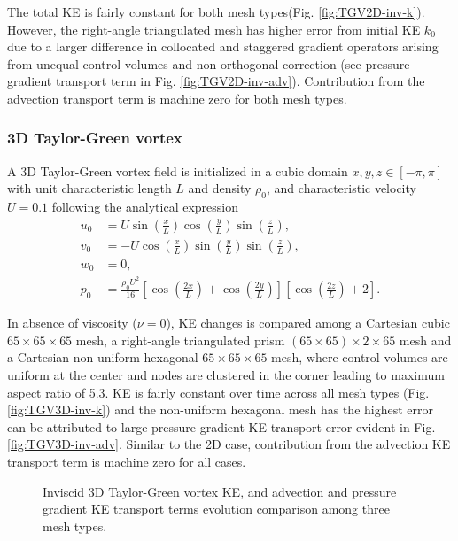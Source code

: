 The total KE is fairly constant for both mesh types(Fig. \ref{fig:TGV2D-inv-k}). However, the right-angle triangulated mesh has higher error from initial KE $k_0$ due to a larger difference in collocated and staggered gradient operators arising from unequal control volumes and non-orthogonal correction (see pressure gradient transport term in Fig. \ref{fig:TGV2D-inv-adv}). Contribution from the advection transport term is machine zero for both mesh types.


\subsubsection{3D Taylor-Green vortex}
A 3D Taylor-Green vortex field is initialized in a cubic domain $x, y,z \in [-\pi, \pi]$ with unit characteristic length $L$ and density $\rho_0$, and characteristic velocity $U=0.1$ following the analytical expression
\begin{equation}
\begin{split}
u_0 &=U \sin \left(\frac{x}{L}\right) \cos \left(\frac{y}{L}\right) \sin \left(\frac{z}{L}\right),
\\
v_0 &=-U \cos \left(\frac{x}{L}\right) \sin \left(\frac{y}{L}\right) \sin \left(\frac{z}{L}\right), 
\\
w_0 &=0, 
\\
p_0 &=\frac{\rho_{0} U^{2}}{16} \left[\cos \left(\frac{2 x}{L}\right)+\cos \left(\frac{2 y}{L}\right)\right] \left[\cos \left(\frac{2 z}{L}\right)+2\right].
\end{split}
\end{equation}

In absence of viscosity ($\nu=0$), KE changes is compared among a Cartesian cubic $65 \times 65 \times 65$ mesh, a right-angle triangulated prism $(65 \times 65)\times 2 \times 65$ mesh and a Cartesian non-uniform hexagonal $65 \times 65 \times 65$ mesh, where control volumes are uniform at the center and nodes are clustered in the corner leading to maximum aspect ratio of 5.3. KE is fairly constant over time across all mesh types (Fig. \ref{fig:TGV3D-inv-k}) and the non-uniform hexagonal mesh has the highest error can be attributed to large pressure gradient KE transport error evident in Fig. \ref{fig:TGV3D-inv-adv}. Similar to the 2D case, contribution from the advection KE transport term is machine zero for all cases.

\begin{figure}[!h]
\centering
{}
\caption{Inviscid 3D Taylor-Green vortex KE, and advection and pressure gradient KE transport terms evolution comparison among three mesh types.} 
\label{fig:TGV3D-inv}
\end{figure}


